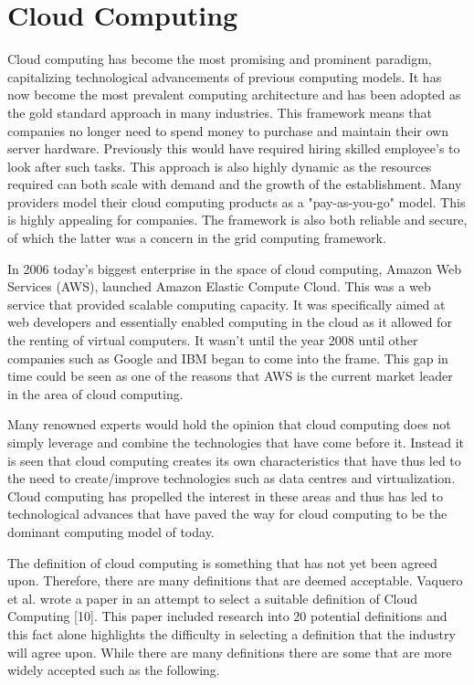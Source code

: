 \documentclass[oneside,12pt]{Classes/RoboticsLaTeX}
\begin{document}
\section{Cloud Computing}
Cloud computing has become the most promising and prominent paradigm, capitalizing technological advancements of previous computing models. It has now become the most prevalent computing architecture and has been adopted as the gold standard approach in many industries. This framework means that companies no longer need to spend money to purchase and maintain their own server hardware. Previously this would have required hiring skilled employee's to look after such tasks. This approach is also highly dynamic as the resources required can both scale with demand and the growth of the establishment. Many providers model their cloud computing products as a "pay-as-you-go" model. This is highly appealing for companies. The framework is also both reliable and secure, of which the latter was a concern in the grid computing framework.

In 2006 today's biggest enterprise in the space of cloud computing, Amazon Web Services (AWS), launched Amazon Elastic Compute Cloud. This was a web service that provided scalable computing capacity. It was specifically aimed at web developers and essentially enabled computing in the cloud as it allowed for the renting of virtual computers. It wasn't until the year 2008 until other companies such as Google and IBM began to come into the frame. This gap in time could be seen as one of the reasons that AWS is the current market leader in the area of cloud computing. 

Many renowned experts would hold the opinion that cloud computing does not simply leverage and combine the technologies that have come before it. Instead it is seen that cloud computing creates its own characteristics that have thus led to the need to create/improve technologies such as data centres and virtualization. Cloud computing has propelled the interest in these areas and thus has led to technological advances that have paved the way for cloud computing to be the dominant computing model of today. 

The definition of cloud computing is something that has not yet been agreed upon. Therefore, there are many definitions that are deemed acceptable. Vaquero et al. wrote a paper in an attempt to select a suitable definition of Cloud Computing [10]. This paper included research into 20 potential definitions and this fact alone highlights the difficulty in selecting a definition that the industry will agree upon. While there are many definitions there are some that are more widely accepted such as the following. 
\end{document}
